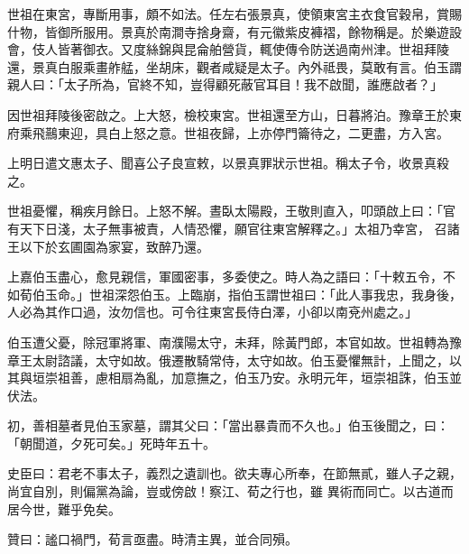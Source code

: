 \begin{pinyinscope}
 世祖在東宮，專斷用事，頗不如法。任左右張景真，使領東宮主衣食官穀帛，賞賜什物，皆御所服用。景真於南澗寺捨身齋，有元徽紫皮褲褶，餘物稱是。於樂遊設會，伎人皆著御衣。又度絲錦與昆侖舶營貨，輒使傳令防送過南州津。世祖拜陵還，景真白服乘畫舴艋，坐胡床，觀者咸疑是太子。內外祗畏，莫敢有言。伯玉謂親人曰：「太子所為，官終不知，豈得顧死蔽官耳目！我不啟聞，誰應啟者？」



 因世祖拜陵後密啟之。上大怒，檢校東宮。世祖還至方山，日暮將泊。豫章王於東府乘飛䴏東迎，具白上怒之意。世祖夜歸，上亦停門籥待之，二更盡，方入宮。



 上明日遣文惠太子、聞喜公子良宣敕，以景真罪狀示世祖。稱太子令，收景真殺之。



 世祖憂懼，稱疾月餘日。上怒不解。晝臥太陽殿，王敬則直入，叩頭啟上曰：「官有天下日淺，太子無事被責，人情恐懼，願官往東宮解釋之。」太祖乃幸宮，
 召諸王以下於玄圃園為家宴，致醉乃還。



 上嘉伯玉盡心，愈見親信，軍國密事，多委使之。時人為之語曰：「十敕五令，不如荀伯玉命。」世祖深怨伯玉。上臨崩，指伯玉謂世祖曰：「此人事我忠，我身後，人必為其作口過，汝勿信也。可令往東宮長侍白澤，小卻以南兗州處之。」



 伯玉遭父憂，除冠軍將軍、南濮陽太守，未拜，除黃門郎，本官如故。世祖轉為豫章王太尉諮議，太守如故。俄遷散騎常侍，太守如故。伯玉憂懼無計，上聞之，以其與垣崇祖善，慮相扇為亂，加意撫之，伯玉乃安。永明元年，垣崇祖誅，伯玉並伏法。



 初，善相墓者見伯玉家墓，謂其父曰：「當出暴貴而不久也。」伯玉後聞之，曰：「朝聞道，夕死可矣。」死時年五十。



 史臣曰：君老不事太子，義烈之遺訓也。欲夫專心所奉，在節無貳，雖人子之親，尚宜自別，則偏黨為論，豈或傍啟！察江、荀之行也，雖
 異術而同亡。以古道而居今世，難乎免矣。



 贊曰：謐口禍門，荀言亟盡。時清主異，並合同殞。



\end{pinyinscope}